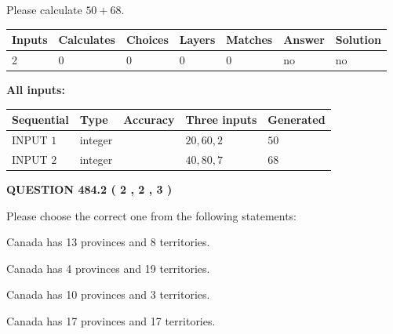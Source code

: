\documentclass[12pt]{article}
\begin{document}
  
 
Please calculate $ %
50 +  %
68 $.
 
 
   
   
   
   
\noindent\begin{tabular}{|l|l|l|l|l|l|l|}
 \hline
Inputs & Calculates & Choices & Layers & Matches & Answer & Solution \\ \hline
 2  & 
 0  & 
 0
  & 
 0  & 
 0  & 
  no & 
  no 
  \\ \hline
 \end{tabular}
   
   
   
   
\noindent{}
   
   
   
   
\noindent\vspace{0.1in}\hspace{-0.08in} {\textbf{\Large{All inputs: }}}
   
   
  
  
\noindent\begin{tabular}{|l|l|l|l|l|}
\hline
 Sequential & Type & Accuracy & Three inputs & Generated \\ 
\hline
 
 
  INPUT $  1 $ & integer &  & $
 20
 , 
 60
 , 
 2
 $ & $ 50 $ 
 \\  \hline  
 
 
  INPUT $  2 $ & integer &  & $
 40
 , 
 80
 , 
 7
 $ & $ 68 $ 
 \\  \hline  
 \end{tabular}
   
   
  
\vspace{0.2in}
  
{\textbf{\Large{QUESTION
484.2 
 ( 2 , 2 , 3 )
}}}
  
  
Please choose the correct one from the following statements:
 
 
Canada has  13 provinces and  8 territories.
 
 
Canada has   4 provinces and  19 territories.
 
 
Canada has 10  provinces and 3 territories.
 
 
Canada has  17 provinces and  17 territories.
 
\end{document}
